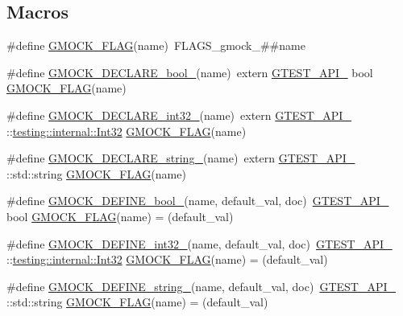 \subsection*{Macros}
\begin{DoxyCompactItemize}
\item 
\#define \hyperlink{gmock-port_8h_ad7119adfef06be5e7b1551633f5a1436}{G\+M\+O\+C\+K\+\_\+\+F\+L\+AG}(name)~F\+L\+A\+G\+S\+\_\+gmock\+\_\+\#\#name
\item 
\#define \hyperlink{gmock-port_8h_a7a0a953221ea8ef5aaa6c644a48af599}{G\+M\+O\+C\+K\+\_\+\+D\+E\+C\+L\+A\+R\+E\+\_\+bool\+\_\+}(name)~extern \hyperlink{gtest-port_8h_aa73be6f0ba4a7456180a94904ce17790}{G\+T\+E\+S\+T\+\_\+\+A\+P\+I\+\_\+} bool \hyperlink{gmock-port_8h_ad7119adfef06be5e7b1551633f5a1436}{G\+M\+O\+C\+K\+\_\+\+F\+L\+AG}(name)
\item 
\#define \hyperlink{gmock-port_8h_adeb7f0a8d842d1d541615763835af3f9}{G\+M\+O\+C\+K\+\_\+\+D\+E\+C\+L\+A\+R\+E\+\_\+int32\+\_\+}(name)~extern \hyperlink{gtest-port_8h_aa73be6f0ba4a7456180a94904ce17790}{G\+T\+E\+S\+T\+\_\+\+A\+P\+I\+\_\+} \+::\hyperlink{namespacetesting_1_1internal_a8ee38faaf875f133358abaf9bc056cec}{testing\+::internal\+::\+Int32} \hyperlink{gmock-port_8h_ad7119adfef06be5e7b1551633f5a1436}{G\+M\+O\+C\+K\+\_\+\+F\+L\+AG}(name)
\item 
\#define \hyperlink{gmock-port_8h_a35af08c45131cf68d78446cb8cfe40fe}{G\+M\+O\+C\+K\+\_\+\+D\+E\+C\+L\+A\+R\+E\+\_\+string\+\_\+}(name)~extern \hyperlink{gtest-port_8h_aa73be6f0ba4a7456180a94904ce17790}{G\+T\+E\+S\+T\+\_\+\+A\+P\+I\+\_\+} \+::std\+::string \hyperlink{gmock-port_8h_ad7119adfef06be5e7b1551633f5a1436}{G\+M\+O\+C\+K\+\_\+\+F\+L\+AG}(name)
\item 
\#define \hyperlink{gmock-port_8h_a470be328fabbeef3987127adc18a1433}{G\+M\+O\+C\+K\+\_\+\+D\+E\+F\+I\+N\+E\+\_\+bool\+\_\+}(name,  default\+\_\+val,  doc)~\hyperlink{gtest-port_8h_aa73be6f0ba4a7456180a94904ce17790}{G\+T\+E\+S\+T\+\_\+\+A\+P\+I\+\_\+} bool \hyperlink{gmock-port_8h_ad7119adfef06be5e7b1551633f5a1436}{G\+M\+O\+C\+K\+\_\+\+F\+L\+AG}(name) = (default\+\_\+val)
\item 
\#define \hyperlink{gmock-port_8h_a19d91081ff0aaab2f60ef1dc2d6e6b34}{G\+M\+O\+C\+K\+\_\+\+D\+E\+F\+I\+N\+E\+\_\+int32\+\_\+}(name,  default\+\_\+val,  doc)~\hyperlink{gtest-port_8h_aa73be6f0ba4a7456180a94904ce17790}{G\+T\+E\+S\+T\+\_\+\+A\+P\+I\+\_\+} \+::\hyperlink{namespacetesting_1_1internal_a8ee38faaf875f133358abaf9bc056cec}{testing\+::internal\+::\+Int32} \hyperlink{gmock-port_8h_ad7119adfef06be5e7b1551633f5a1436}{G\+M\+O\+C\+K\+\_\+\+F\+L\+AG}(name) = (default\+\_\+val)
\item 
\#define \hyperlink{gmock-port_8h_ad6badbf90e5a813e2bd5668fc6b6a8f7}{G\+M\+O\+C\+K\+\_\+\+D\+E\+F\+I\+N\+E\+\_\+string\+\_\+}(name,  default\+\_\+val,  doc)~\hyperlink{gtest-port_8h_aa73be6f0ba4a7456180a94904ce17790}{G\+T\+E\+S\+T\+\_\+\+A\+P\+I\+\_\+} \+::std\+::string \hyperlink{gmock-port_8h_ad7119adfef06be5e7b1551633f5a1436}{G\+M\+O\+C\+K\+\_\+\+F\+L\+AG}(name) = (default\+\_\+val)
\end{DoxyCompactItemize}



